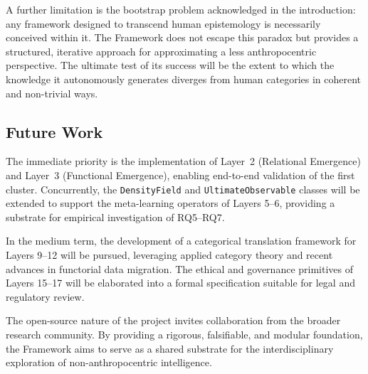 A further limitation is the bootstrap problem acknowledged in the introduction: any framework designed to transcend human epistemology is necessarily conceived within it. The \Apeiron{} Framework does not escape this paradox but provides a structured, iterative approach for approximating a less anthropocentric perspective. The ultimate test of its success will be the extent to which the knowledge it autonomously generates diverges from human categories in coherent and non-trivial ways.

\subsection{Future Work}

The immediate priority is the implementation of Layer~2 (Relational Emergence) and Layer~3 (Functional Emergence), enabling end-to-end validation of the first cluster. Concurrently, the \texttt{DensityField} and \texttt{UltimateObservable} classes will be extended to support the meta-learning operators of Layers 5--6, providing a substrate for empirical investigation of RQ5--RQ7.

In the medium term, the development of a categorical translation framework for Layers 9--12 will be pursued, leveraging applied category theory \cite{fong2019} and recent advances in functorial data migration. The ethical and governance primitives of Layers 15--17 will be elaborated into a formal specification suitable for legal and regulatory review.

The open-source nature of the project invites collaboration from the broader research community. By providing a rigorous, falsifiable, and modular foundation, the \Apeiron{} Framework aims to serve as a shared substrate for the interdisciplinary exploration of non-anthropocentric intelligence.